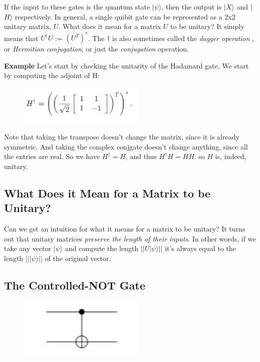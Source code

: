 \documentclass{article}
\begin{document}
If the input to these gates is the quantum state $|$$\psi$$\rangle$, then
the output is $|$$X$$\rangle$ and  $|$$H$$\rangle$ respectively. In general,
a single quibit gate can be represented as a 2x2 unitary matrix, $U$. What does
it mean for a matrix $U$ to be unitary? It simply means that $U^\dagger U$ :=
$(U^T)^*$. The $\dagger$ is also sometimes called the \textit{dagger operation}
, or \textit{Hermitian conjugation}, or just the \textit{conjugation} operation.

\textbf{Example}
Let's start by checking the unitarity of the Hadamard gate, We start by
computing the adjoint of H:

\begin{figure}[h]
    \includegraphics[width=6cm]{3.jpg}
    \centering
\end{figure}

Note that taking the transpose doesn't change the matrix, since it is already
symmetric. And taking the complex conjgate doesn't change anything, since
all the entries are real. So we have $H^\dagger = H$, and thus $H^\dagger H = HH$.
so $H$ is, indeed, unitary.

\subsection*{What Does it Mean for a Matrix to be Unitary?}
Can we get an intuition for what it means for a matrix to be unitary? It turns
out that unitary matrices \textit{preserve the length of their inputs}. In
other words, if we take any vector $|\psi\rangle$ and compute the length $||U|\psi\rangle||$
it's always equal to the length $|||\psi\rangle||$ of the original vector.

\subsection{The Controlled-NOT Gate}

\begin{figure}[h]
    \includegraphics[width=6cm]{4.jpg}
    \centering
\end{figure}
\end{document}

